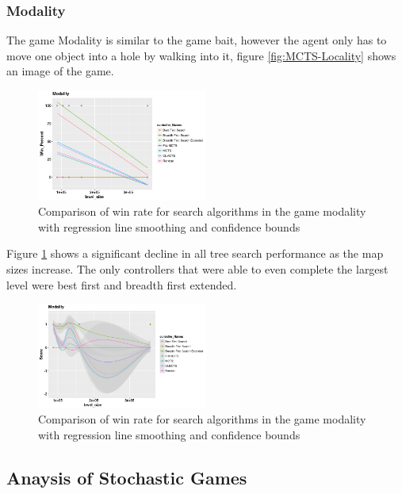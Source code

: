 \documentclass[journal]{IEEEtran}
\begin{document}
		\subsubsection{Modality}
		The game Modality is similar to the game bait, however the agent only has to move one object into a hole by walking into it, figure \ref{fig:MCTS-Locality} shows an image of the game.
		\begin{figure}[h]
		    \centering
		    \includegraphics[width=0.5\textwidth]{Scatter/game_16_win}
		    \caption{ Comparison of win rate for search algorithms in the game modality with regression line smoothing and confidence bounds}
		    \label{fig:game_16_win}
		\end{figure}
		Figure \ref{fig:game_16_win} shows a significant decline in all tree search performance as the map sizes increase.
		The only controllers that were able to even complete the largest level were best first and breadth first extended.

		\begin{figure}[h]
		    \centering
		    \includegraphics[width=0.5\textwidth]{Scatter/game_16_Score_smoothing_confidence}
		    \caption{ Comparison of win rate for search algorithms in the game modality with regression line smoothing and confidence bounds}
		    \label{fig:game_4_score_confidence}
		\end{figure}

		
		



	 \subsection{Anaysis of Stochastic Games} \label{AoSG}
\end{document}
